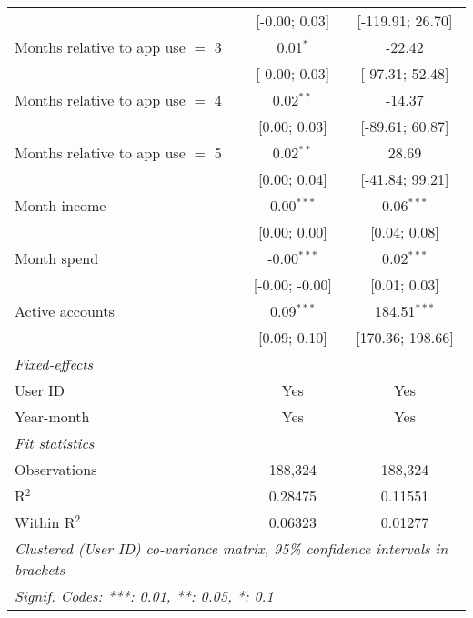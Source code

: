 \begin{table}[htbp]
\begin{threeparttable}[b]
\begin{tabular}{lcc}
                                           & [-0.00; 0.03]            & [-119.91; 26.70]\\   
         Months relative to app use $=$ 3  & 0.01$^{*}$               & -22.42\\   
                                           & [-0.00; 0.03]            & [-97.31; 52.48]\\   
         Months relative to app use $=$ 4  & 0.02$^{**}$              & -14.37\\   
                                           & [0.00; 0.03]             & [-89.61; 60.87]\\   
         Months relative to app use $=$ 5  & 0.02$^{**}$              & 28.69\\   
                                           & [0.00; 0.04]             & [-41.84; 99.21]\\   
         Month income                      & 0.00$^{***}$             & 0.06$^{***}$\\   
                                           & [0.00; 0.00]             & [0.04; 0.08]\\   
         Month spend                       & -0.00$^{***}$            & 0.02$^{***}$\\   
                                           & [-0.00; -0.00]           & [0.01; 0.03]\\   
         Active accounts                   & 0.09$^{***}$             & 184.51$^{***}$\\   
                                           & [0.09; 0.10]             & [170.36; 198.66]\\   
         \midrule
         \emph{Fixed-effects}\\
         User ID                           & Yes                      & Yes\\  
         Year-month                        & Yes                      & Yes\\  
         \midrule
         \emph{Fit statistics}\\
         Observations                      & 188,324                  & 188,324\\  
         R$^2$                             & 0.28475                  & 0.11551\\  
         Within R$^2$                      & 0.06323                  & 0.01277\\  
         \midrule \midrule
         \multicolumn{3}{l}{\emph{Clustered (User ID) co-variance matrix, 95\% confidence intervals in brackets}}\\
         \multicolumn{3}{l}{\emph{Signif. Codes: ***: 0.01, **: 0.05, *: 0.1}}\\
      \end{tabular}
   \end{threeparttable}
\end{table}


